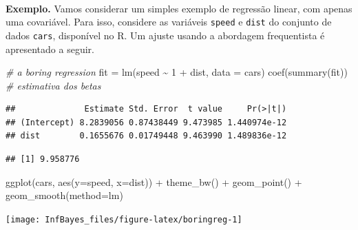 \documentclass[
]{book}
\newenvironment{Shaded}{\begin{snugshade}}{\end{snugshade}}
\newcommand{\AttributeTok}[1]{\textcolor[rgb]{0.77,0.63,0.00}{#1}}
\newcommand{\CommentTok}[1]{\textcolor[rgb]{0.56,0.35,0.01}{\textit{#1}}}
\newcommand{\DecValTok}[1]{\textcolor[rgb]{0.00,0.00,0.81}{#1}}
\newcommand{\FunctionTok}[1]{\textcolor[rgb]{0.00,0.00,0.00}{#1}}
\newcommand{\NormalTok}[1]{#1}
\newcommand{\OtherTok}[1]{\textcolor[rgb]{0.56,0.35,0.01}{#1}}
\newcommand{\SpecialCharTok}[1]{\textcolor[rgb]{0.00,0.00,0.00}{#1}}
\begin{document}
\(~\)

\textbf{Exemplo.} Vamos considerar um simples exemplo de regressão linear, com apenas uma covariável. Para isso, considere as variáveis \texttt{speed} e \texttt{dist} do conjunto de dados \texttt{cars}, disponível no R. Um ajuste usando a abordagem frequentista é apresentado a seguir.

\begin{Shaded}
\begin{Highlighting}[]
\CommentTok{\# a boring regression}
\NormalTok{fit }\OtherTok{=} \FunctionTok{lm}\NormalTok{(speed }\SpecialCharTok{\textasciitilde{}} \DecValTok{1} \SpecialCharTok{+}\NormalTok{ dist, }\AttributeTok{data =}\NormalTok{ cars)}
\FunctionTok{coef}\NormalTok{(}\FunctionTok{summary}\NormalTok{(fit)) }\CommentTok{\# estimativa dos betas}
\end{Highlighting}
\end{Shaded}

\begin{verbatim}
##              Estimate Std. Error  t value     Pr(>|t|)
## (Intercept) 8.2839056 0.87438449 9.473985 1.440974e-12
## dist        0.1655676 0.01749448 9.463990 1.489836e-12
\end{verbatim}

\begin{Shaded}
\end{Shaded}

\begin{verbatim}
## [1] 9.958776
\end{verbatim}

\begin{Shaded}
\begin{Highlighting}[]
\FunctionTok{ggplot}\NormalTok{(cars, }\FunctionTok{aes}\NormalTok{(}\AttributeTok{y=}\NormalTok{speed, }\AttributeTok{x=}\NormalTok{dist)) }\SpecialCharTok{+} \FunctionTok{theme\_bw}\NormalTok{() }\SpecialCharTok{+}
  \FunctionTok{geom\_point}\NormalTok{() }\SpecialCharTok{+} \FunctionTok{geom\_smooth}\NormalTok{(}\AttributeTok{method=}\NormalTok{lm)}
\end{Highlighting}
\end{Shaded}

\begin{center}\texttt{[image: InfBayes\_files/figure-latex/boringreg-1]} \end{center}
\end{document}
